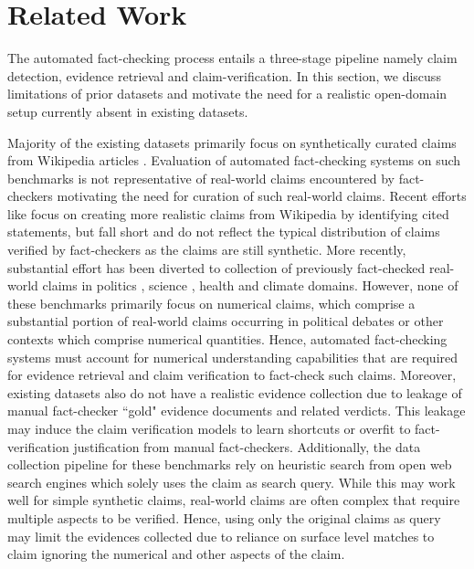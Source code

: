 
\section{Related Work}

The automated fact-checking process entails a three-stage pipeline namely claim detection, evidence retrieval and claim-verification. In this section, we discuss limitations of prior datasets and motivate the need for a realistic open-domain setup currently absent in existing datasets.

Majority of the existing datasets primarily focus on synthetically curated claims from Wikipedia articles \cite{jiang2020hover,thorne-etal-2018-fever,aly2021feverous,creditassess,schuster2021vitamin,sathe-etal-2020-automated}. Evaluation of automated fact-checking systems on such benchmarks is not representative of real-world claims encountered by fact-checkers motivating the need for curation of such real-world claims.  Recent efforts like \cite{kamoi2023wice} focus on creating more realistic claims from Wikipedia by identifying cited statements, but fall short and do not reflect the typical distribution of claims verified by fact-checkers as the claims are still synthetic. More recently, substantial effort has been diverted to collection of previously fact-checked real-world claims in politics \cite{multifc,averitec,claimdecomp}, science \cite{wadden-etal-2020-fact,vladika2023scientific,wright2022generating}, health \cite{kotonya2020explainable} and climate \cite{diggelmann2021climatefever} domains.  However, none of these benchmarks primarily focus on numerical claims, which comprise a substantial portion of real-world claims occurring in political debates or other contexts which comprise numerical quantities. Hence, automated fact-checking systems must account for numerical understanding capabilities that are required for evidence retrieval and claim verification to fact-check such claims. Moreover, existing datasets also do not have a realistic evidence collection due to leakage of manual fact-checker ``gold" evidence documents and related verdicts. This leakage may induce the claim verification models to learn shortcuts or overfit to fact-verification justification from manual fact-checkers. Additionally, the data collection pipeline for these benchmarks rely on heuristic search from open web search engines which solely uses the claim as search query. While this may work well for simple synthetic claims, real-world claims are often complex that require multiple aspects to be verified. Hence, using only the original claims as query may limit the evidences collected due to reliance on surface level matches to claim ignoring the numerical and other aspects of the claim.


